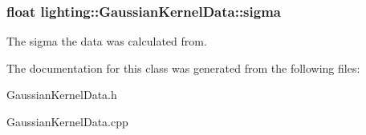 \subsubsection[{\texorpdfstring{sigma}{sigma}}]{\setlength{\rightskip}{0pt plus 5cm}float lighting\+::\+Gaussian\+Kernel\+Data\+::sigma}\hypertarget{classlighting_1_1GaussianKernelData_ac99c7370fa30896baef2f03c91dd6885}{}\label{classlighting_1_1GaussianKernelData_ac99c7370fa30896baef2f03c91dd6885}


The sigma the data was calculated from. 



The documentation for this class was generated from the following files\+:\begin{DoxyCompactItemize}
\item 
Gaussian\+Kernel\+Data.\+h\item 
Gaussian\+Kernel\+Data.\+cpp\end{DoxyCompactItemize}
